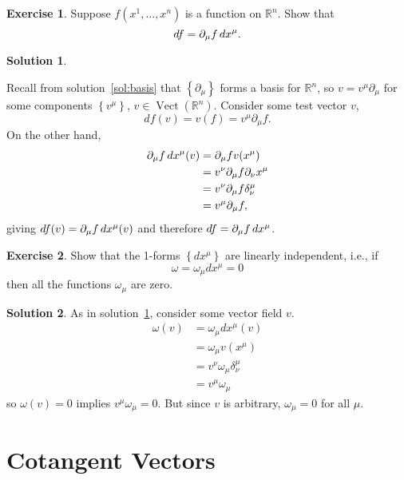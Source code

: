 \documentclass[11pt, a4paper]{report}
\theoremstyle{definition}
\newtheorem{exercise}{Exercise}[part]
\newtheorem{solution}{Solution}[part]
\newenvironment{ex}{\begin{exercise}}{\end{exercise}\pagebreak[1]}
\newenvironment{sol}{\begin{solution}}{\end{solution}\pagebreak[3]}
\renewcommand*{\d}{\ensuremath\mathop{}\mathopen{}d}
\DeclareMathOperator{\Vect}{Vect}
\begin{document}
\begin{ex}

Suppose $f(x^1, \ldots, x^n)$ is a function on $\mathbb{R}^n$. Show that
\[
    df = \partial_\mu f \d x^\mu.
\]

\end{ex}

\begin{sol}\label{sol:gradient}

Recall from solution~\ref{sol:basis} that $\left\{\partial_\mu\right\}$ forms a basis for $\mathbb{R}^n$, so $v = v^\mu \partial_\mu$ for some components $\left\{v^\mu\right\}$, $v \in \Vect(\mathbb{R}^n)$. Consider some test vector $v$,
\[
    df(v) = v(f) = v^\mu \partial_\mu f.
\]
On the other hand,
\begin{align*}
    \partial_\mu f \d x^\mu (v) &= \partial_\mu f v(x^\mu) \\
        &= v^\nu \partial_\mu f \partial_\nu x^\mu \\
        &= v^\nu \partial_\mu f \delta_\nu^\mu \\
        &= v^\mu \partial_\mu f,
\end{align*}
giving $df(v) = \partial_\mu f \d x^\mu(v)$ and therefore $df = \partial_\mu f\d x^\mu$.

\end{sol}

\begin{ex}

Show that the 1-forms $\left\{dx^\mu\right\}$ are linearly independent, i.e., if
\[
    \omega = \omega_\mu dx^\mu = 0
\]
then all the functions $\omega_\mu$ are zero.

\end{ex}

\begin{sol}

As in solution~\ref{sol:gradient}, consider some vector field $v$.
\begin{align*}
    \omega (v) &= \omega_\mu dx^\mu (v) \\
               &= \omega_\mu v(x^\mu) \\
               &= v^\nu \omega_\mu \delta_\nu^\mu \\
               &= v^\mu \omega_\mu
\end{align*}
so $\omega(v) = 0$ implies $v^\mu \omega_\mu = 0$. But since $v$ is arbitrary, $\omega_\mu = 0$ for all $\mu$.

\end{sol}

\section{Cotangent Vectors}\label{sec:cotangentvectors}
\end{document}

